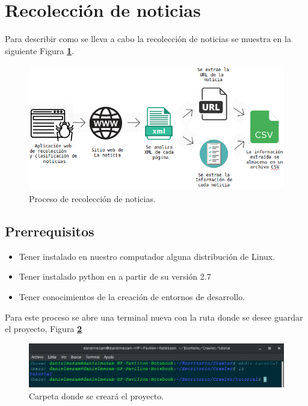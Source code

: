 \section{Recolección de noticias}
Para describir como se lleva a cabo la recolección de noticias se muestra en la siguiente Figura \textbf{\ref{fig:diagrama}}.

\begin{figure}[H]
  \centering
  \includegraphics[scale=.50]{imagenes/Capitulo5/diagrama}
  \caption{Proceso de recolección de noticias.}
  \label{fig:diagrama}
\end{figure}

\subsection{Prerrequisitos}
\begin{itemize}
    \item Tener instalado en nuestro computador alguna distribución de Linux.
    \item Tener instalado python en a partir de su versión 2.7
    \item Tener conocimientos de la creación de entornos de desarrollo.
\end{itemize}

Para este proceso se abre una terminal nueva con la ruta donde se desee guardar el proyecto, Figura \textbf{\ref{fig:uno}} 

\begin{figure}[H]
  \centering
  \includegraphics[scale=.35]{imagenes/Capitulo5/1}
  \caption{Carpeta donde se creará el proyecto.}
  \label{fig:uno}
\end{figure}


